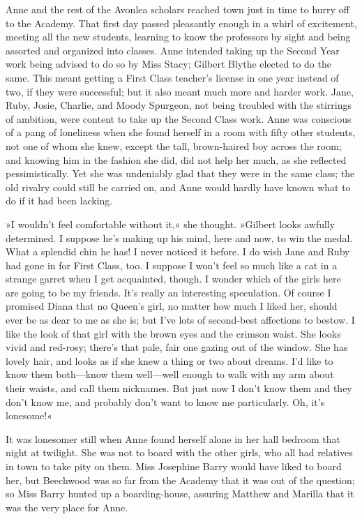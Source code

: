 Anne and the rest of the Avonlea scholars reached town just in time to hurry off to the Academy. That first day passed pleasantly enough in a whirl of excitement, meeting all the new students, learning to know the professors by sight and being assorted and organized into classes. Anne intended taking up the Second Year work being advised to do so by Miss Stacy; Gilbert Blythe elected to do the same. This meant getting a First Class teacher's license in one year instead of two, if they were successful; but it also meant much more and harder work. Jane, Ruby, Josie, Charlie, and Moody Spurgeon, not being troubled with the stirrings of ambition, were content to take up the Second Class work. Anne was conscious of a pang of loneliness when she found herself in a room with fifty other students, not one of whom she knew, except the tall, brown-haired boy across the room; and knowing him in the fashion she did, did not help her much, as she reflected pessimistically. Yet she was undeniably glad that they were in the same class; the old rivalry could still be carried on, and Anne would hardly have known what to do if it had been lacking.

»I wouldn't feel comfortable without it,« she thought. »Gilbert looks awfully determined. I suppose he's making up his mind, here and now, to win the medal. What a splendid chin he has! I never noticed it before. I do wish Jane and Ruby had gone in for First Class, too. I suppose I won't feel so much like a cat in a strange garret when I get acquainted, though. I wonder which of the girls here are going to be my friends. It's really an interesting speculation. Of course I promised Diana that no Queen's girl, no matter how much I liked her, should ever be as dear to me as she is; but I've lots of second-best affections to bestow. I like the look of that girl with the brown eyes and the crimson waist. She looks vivid and red-rosy; there's that pale, fair one gazing out of the window. She has lovely hair, and looks as if she knew a thing or two about dreams. I'd like to know them both—know them well—well enough to walk with my arm about their waists, and call them nicknames. But just now I don't know them and they don't know me, and probably don't want to know me particularly. Oh, it's lonesome!«

It was lonesomer still when Anne found herself alone in her hall bedroom that night at twilight. She was not to board with the other girls, who all had relatives in town to take pity on them. Miss Josephine Barry would have liked to board her, but Beechwood was so far from the Academy that it was out of the question; so Miss Barry hunted up a boarding-house, assuring Matthew and Marilla that it was the very place for Anne.

